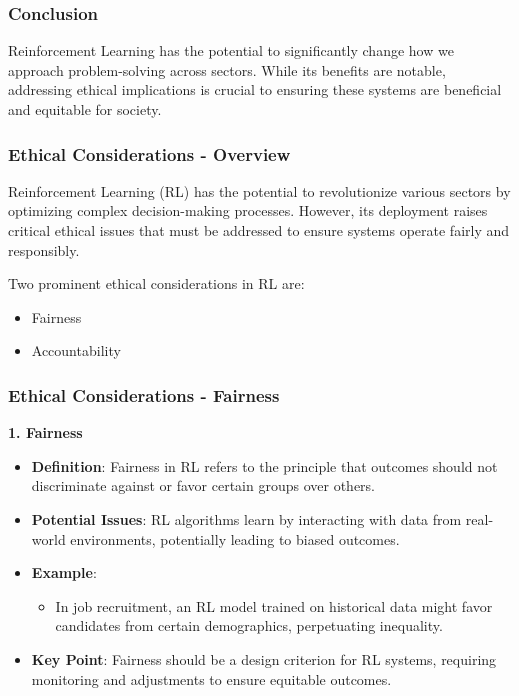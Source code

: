 \documentclass[aspectratio=169]{beamer}
\begin{document}
\begin{frame}[fragile]
  \frametitle{Conclusion}
  Reinforcement Learning has the potential to significantly change how we approach problem-solving across sectors. While its benefits are notable, addressing ethical implications is crucial to ensuring these systems are beneficial and equitable for society.
\end{frame}

\begin{frame}[fragile]
  \frametitle{Ethical Considerations - Overview}
  
  Reinforcement Learning (RL) has the potential to revolutionize various sectors by optimizing complex decision-making processes. 
  However, its deployment raises critical ethical issues that must be addressed to ensure systems operate fairly and responsibly.
  
  Two prominent ethical considerations in RL are:
  \begin{itemize}
    \item Fairness
    \item Accountability
  \end{itemize}
\end{frame}

\begin{frame}[fragile]
  \frametitle{Ethical Considerations - Fairness}
  
  \textbf{1. Fairness}
  
  \begin{itemize}
    \item \textbf{Definition}: Fairness in RL refers to the principle that outcomes should not discriminate against or favor certain groups over others.
    
    \item \textbf{Potential Issues}: RL algorithms learn by interacting with data from real-world environments, potentially leading to biased outcomes.
    
    \item \textbf{Example}: 
    \begin{itemize}
      \item In job recruitment, an RL model trained on historical data might favor candidates from certain demographics, perpetuating inequality.
    \end{itemize}
    
    \item \textbf{Key Point}: Fairness should be a design criterion for RL systems, requiring monitoring and adjustments to ensure equitable outcomes.
  \end{itemize}
\end{frame}
\end{document}
